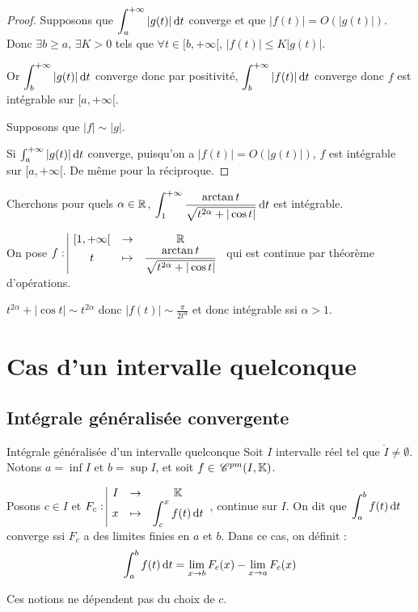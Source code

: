 \begin{proof}
    Supposons que $\displaystyle \int_{a }^{+ \infty } |g(t)| \,\mathrm{d}t$ converge et que 
    $|f(t)| = O(|g(t)|)$. Donc $\exists b \geqslant a, \, \exists K > 0$ tels que 
    $\forall t \in [b, + \infty[, \, |f(t)| \leqslant K |g(t)|$.

    Or $\displaystyle \int_{b }^{+ \infty   } |g(t)| \,\mathrm{d}t$ converge donc par positivité,
    $\displaystyle \int_{b }^{+ \infty   } |f(t)| \,\mathrm{d}t$ converge donc $f$ est intégrable sur $[a, + \infty[$.


    \lvspace Supposons que $|f| \sim |g|$. 

    Si $\int_{a }^{+ \infty   } |g(t)| \,\mathrm{d}t$ converge, puisqu'on a $|f(t)| = O(|g(t)|)$,
    $f$ est intégrable sur $[a, + \infty[$. De même pour la réciproque.
\end{proof}

\begin{exemple}
    Cherchons pour quels $\alpha \in \mathbb{R}$, $\displaystyle \int_1^{+ \infty} \frac{\arctan t}{\sqrt{t^{2 \alpha} + |\cos t|}} \,\mathrm{d}t$ est intégrable.


    On pose $f: \space \begin{array}{|ccc} \displaystyle [1, + \infty[ & \to & \displaystyle \mathbb{R} \\ \displaystyle t & \mapsto & \displaystyle \frac{\arctan t}{\sqrt{t^{2 \alpha} + |\cos t|}} \end{array}$ qui est continue par théorème d'opérations.

    $t^{2 \alpha} + | \cos t | \sim t^{2 \alpha}$ donc $|f(t)| \sim \frac{\pi}{2 t^\alpha}$ et donc 
    intégrable ssi $\alpha > 1$.
\end{exemple}

\section{Cas d'un intervalle quelconque }
\subsection{Intégrale généralisée convergente }

\begin{definition}{Intégrale généralisée d'un intervalle quelconque}{}
    Soit $I$ intervalle réel tel que $\mathring I \neq \emptyset$. 
    Notons $a = \inf I$ et $b = \sup I$, et soit ${f \in \,\mathscr C^{pm}(I, \mathbb{K})}$.

    Posons $c \in I$ et $F_c: \space \begin{array}{|ccc} \displaystyle I & \to & \displaystyle \mathbb{K} \\ \displaystyle x & \mapsto & \displaystyle \int_c^x f(t) \,\mathrm{d}t \end{array}$, continue sur $I$. 
    On dit que $\displaystyle \int_{a }^{b } f(t) \,\mathrm{d}t$ converge ssi $F_c$ a des limites finies 
    en $a$ et $b$. Dans ce cas, on définit : 
    $$\int_a^b f(t) \,\mathrm{d}t = \lim_{x \to b} F_c(x) - \lim_{x \to a} F_c(x)$$

    Ces notions ne dépendent pas du choix de $c$.
\end{definition}

